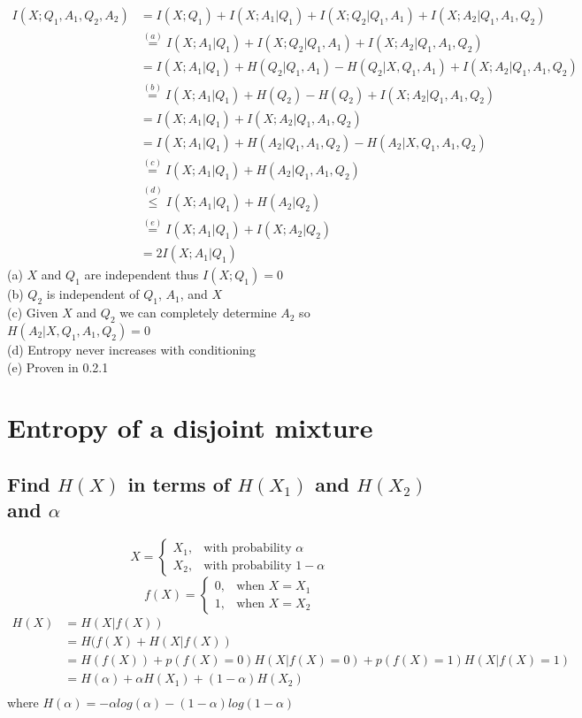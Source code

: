 \documentclass[11pt, oneside]{book}   	%
\begin{document}
\begin{equation}
\begin{split}
 I(X;Q_1,A_1,Q_2,A_2) & = I(X;Q_1) + I(X;A_1|Q_1) + I(X;Q_2|Q_1,A_1) + I(X;A_2|Q_1, A_1, Q_2)\\
 & \overset{(a)}{=} I(X;A_1|Q_1) + I(X;Q_2|Q_1,A_1) + I(X;A_2|Q_1, A_1, Q_2)\\
 & = I(X;A_1|Q_1) + H(Q_2|Q_1,A_1) - H(Q_2|X,Q_1,A_1) + I(X;A_2|Q_1, A_1, Q_2)\\
 & \overset{(b)}{=} I(X;A_1|Q_1) + H(Q_2) - H(Q_2) + I(X;A_2|Q_1, A_1, Q_2)\\
 & = I(X;A_1|Q_1) + I(X;A_2|Q_1, A_1, Q_2)\\
 & = I(X;A_1|Q_1) + H(A_2|Q_1,A_1,Q_2) - H(A_2|X,Q_1,A_1,Q_2)\\
 & \overset{(c)}{=} I(X;A_1|Q_1) + H(A_2|Q_1,A_1,Q_2)\\
 & \overset{(d)}{\leq} I(X;A_1|Q_1) + H(A_2|Q_2)\\
 & \overset{(e)}{=} I(X;A_1|Q_1)+I(X;A_2|Q_2)\\
 & = 2I(X;A_1|Q_1)
\end{split}
\end{equation}
(a) $X$ and $Q_1$ are independent thus $I(X;Q_1)=0$\\
(b) $Q_2$ is independent of $Q_1$, $A_1$, and $X$\\
(c) Given $X$ and $Q_2$ we can completely determine $A_2$ so $H(A_2|X,Q_1,A_1,Q_2) = 0$\\
(d) Entropy never increases with conditioning\\
(e) Proven in 0.2.1

\section{Entropy of a disjoint mixture}
\subsection{Find $H(X)$ in terms of $H(X_1)$ and $H(X_2)$ and $\alpha$}

\[
    X= 
\begin{cases}
    X_1, & \text{with probability } \alpha\\
    X_2, & \text{with probability } 1-\alpha
\end{cases}
\]
\[
    f(X)= 
\begin{cases}
    0, & \text{when } X=X_1\\
    1, & \text{when } X=X_2
\end{cases}
\]
\begin{equation}
\begin{split}
 H(X) & = H(X|f(X))\\
 & = H(f(X) + H(X|f(X))\\
 & = H(f(X)) + p(f(X)=0)H(X|f(X)=0) +p(f(X)=1)H(X|f(X)=1)\\
 & = H(\alpha) + \alpha H(X_1) + (1-\alpha)H(X_2)\\
\end{split}
\end{equation}
where $H(\alpha) = -\alpha log( \alpha) - (1-\alpha)log(1-\alpha)$
\end{document}
